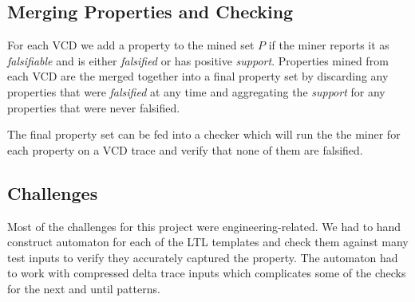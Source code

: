 \documentclass[acmlarge,11pt]{acmart}
\begin{document}
\subsection{Merging Properties and Checking}
For each VCD we add a property to the mined set $P$ if the miner reports it as \textit{falsifiable} and is either \textit{falsified} or has positive \textit{support}.
Properties mined from each VCD are the merged together into a final property set by discarding any properties that were \textit{falsified} at any time and aggregating the \textit{support} for any properties that were never falsified.

The final property set can be fed into a checker which will run the the miner for each property on a VCD trace and verify that none of them are falsified.

\subsection{Challenges}
Most of the challenges for this project were engineering-related.
We had to hand construct automaton for each of the LTL templates and check them against many test inputs to verify they accurately captured the property.
The automaton had to work with compressed delta trace inputs which complicates some of the checks for the next and until patterns.
\end{document}

